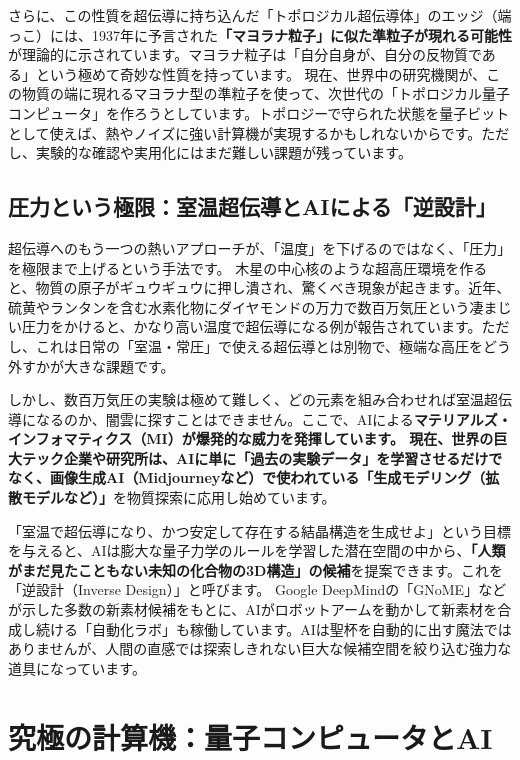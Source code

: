 さらに、この性質を超伝導に持ち込んだ「トポロジカル超伝導体」のエッジ（端っこ）には、1937年に予言された\textbf{「マヨラナ粒子」に似た準粒子が現れる可能性}が理論的に示されています。マヨラナ粒子は「自分自身が、自分の反物質である」という極めて奇妙な性質を持っています。 現在、世界中の研究機関が、この物質の端に現れるマヨラナ型の準粒子を使って、次世代の「トポロジカル量子コンピュータ」を作ろうとしています。トポロジーで守られた状態を量子ビットとして使えば、熱やノイズに強い計算機が実現するかもしれないからです。ただし、実験的な確認や実用化にはまだ難しい課題が残っています。

\subsection{圧力という極限：室温超伝導とAIによる「逆設計」}

超伝導へのもう一つの熱いアプローチが、「温度」を下げるのではなく、「圧力」を極限まで上げるという手法です。 木星の中心核のような超高圧環境を作ると、物質の原子がギュウギュウに押し潰され、驚くべき現象が起きます。近年、硫黄やランタンを含む水素化物にダイヤモンドの万力で数百万気圧という凄まじい圧力をかけると、かなり高い温度で超伝導になる例が報告されています。ただし、これは日常の「室温・常圧」で使える超伝導とは別物で、極端な高圧をどう外すかが大きな課題です。

しかし、数百万気圧の実験は極めて難しく、どの元素を組み合わせれば室温超伝導になるのか、闇雲に探すことはできません。ここで、AIによる\textbf{マテリアルズ・インフォマティクス（MI）が爆発的な威力を発揮しています。 現在、世界の巨大テック企業や研究所は、AIに単に「過去の実験データ」を学習させるだけでなく、画像生成AI（Midjourneyなど）で使われている「生成モデリング（拡散モデルなど）」}を物質探索に応用し始めています。

「室温で超伝導になり、かつ安定して存在する結晶構造を生成せよ」という目標を与えると、AIは膨大な量子力学のルールを学習した潜在空間の中から、\textbf{「人類がまだ見たこともない未知の化合物の3D構造」の候補}を提案できます。これを「逆設計（Inverse Design）」と呼びます。 Google DeepMindの「GNoME」などが示した多数の新素材候補をもとに、AIがロボットアームを動かして新素材を合成し続ける「自動化ラボ」も稼働しています。AIは聖杯を自動的に出す魔法ではありませんが、人間の直感では探索しきれない巨大な候補空間を絞り込む強力な道具になっています。

\section{究極の計算機：量子コンピュータとAI}

